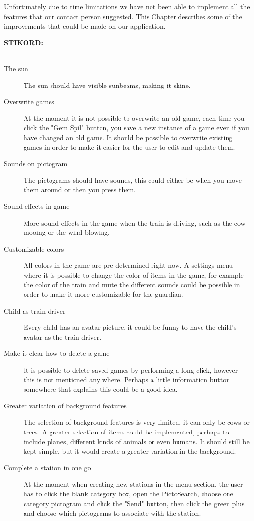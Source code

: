Unfortunately due to time limitations we have not been able to implement all the features that our contact person suggested. This Chapter describes some of the improvements that could be made on our application.

\textbf{STIKORD:}\\\\
\begin{description}
\item[The sun] The sun should have visible sunbeams, making it shine. 
\item[Overwrite games] At the moment it is not possible to overwrite an old game, each time you click the "Gem Spil" button, you save a new instance of a game even if you have changed an old game. It should be possible to overwrite existing games in order to make it easier for the user to edit and update them.
\item[Sounds on pictogram] The pictograms should have sounds, this could either be when you move them around or then you press them. 
\item[Sound effects in game] More sound effects in the game when the train is driving, such as the cow mooing or the wind blowing. 
\item[Customizable colors] All colors in the game are pre-determined right now. A settings menu where it is possible to change the color of items in the game, for example the color of the train and mute the different sounds could be possible in order to make it more customizable for the guardian.  
\item[Child as train driver] Every child has an avatar picture, it could be funny to have the child's avatar as the train driver. 
\item[Make it clear how to delete a game] It is possible to delete saved games by performing a long click, however this is not mentioned any where. Perhaps a little information button somewhere that explains this could be a good idea. 
\item[Greater variation of background features] The selection of background features is very limited, it can only be cows or trees. A greater selection of items could be implemented, perhaps to include planes, different kinds of animals or even humans. It should still be kept simple, but it would create a greater variation in the background. 
\item[Complete a station in one go] At the moment when creating new stations in the menu section, the user has to click the blank category box, open the PictoSearch, choose one category pictogram and click the "Send" button, then click the green plus and choose which pictograms to associate with the station.


\end{description}
